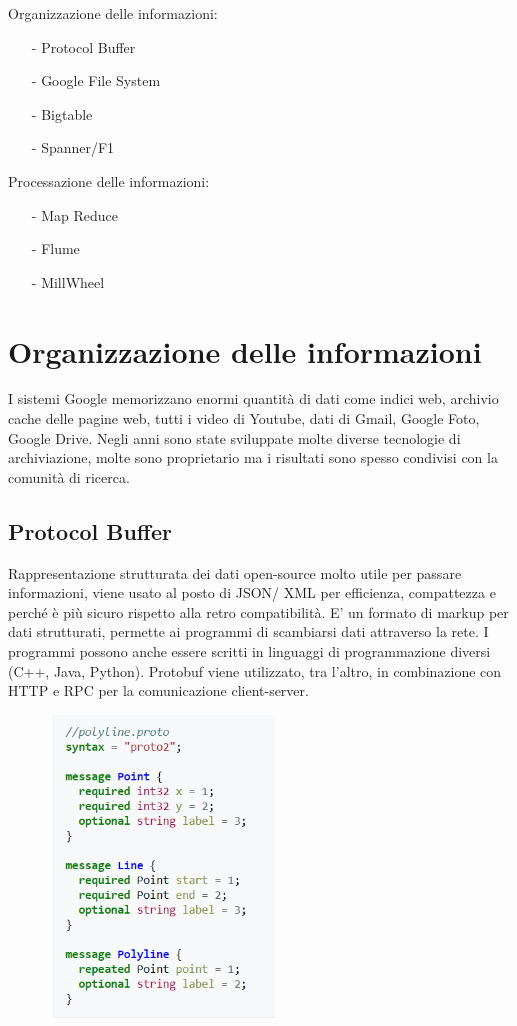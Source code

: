 \documentclass[12pt,italian]{report}
\begin{document}
\noindent Organizzazione delle informazioni:
\begin{itemize}
    \item [-] Protocol Buffer
    \item [-] Google File System
    \item [-] Bigtable
    \item [-] Spanner/F1
\end{itemize}

\noindent Processazione delle informazioni:
\begin{itemize}
    \item [-] Map Reduce
    \item [-] Flume
    \item [-] MillWheel
\end{itemize}

\section{Organizzazione delle informazioni}
I sistemi Google memorizzano enormi quantità di dati come indici web, archivio cache delle pagine web, tutti i video di Youtube, dati di Gmail, Google Foto, Google Drive. Negli anni sono state sviluppate molte diverse tecnologie di archiviazione, molte sono proprietario ma i risultati sono spesso condivisi con la comunità di ricerca.

\subsection{Protocol Buffer}
Rappresentazione strutturata dei dati open-source molto utile per passare informazioni, viene usato al posto di JSON/ XML per efficienza, compattezza e perché è più sicuro rispetto alla retro compatibilità. 
\bigbreak
E' un formato di markup per dati strutturati, permette ai programmi di scambiarsi dati attraverso la rete. I programmi possono anche essere scritti in linguaggi di programmazione diversi (C++, Java, Python). Protobuf viene utilizzato, tra l'altro, in combinazione con HTTP e RPC per la comunicazione client-server.

\begin{figure}[h]
\centering
\includegraphics[width=60mm]{img/protobuf.PNG}
\end{figure}
\end{document}
